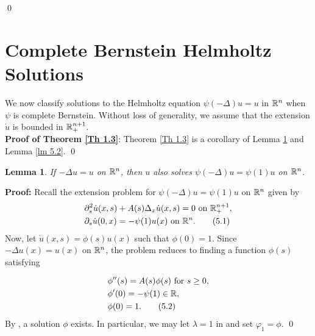 \documentclass{article}
\newtheorem{lemma}[theorem]{Lemma}
\begin{document}
\qed

\section{Complete Bernstein Helmholtz Solutions}

We now classify solutions to the Helmholtz equation $\psi(-\Delta)u = u$ in $\mathbb{R}^n$ when $\psi$ is complete Bernstein. Without loss of generality, we assume that the extension $\dot{u}$ is bounded in $\mathbb{R}^{n+1}_+$.\\

\noindent
\textbf{Proof of Theorem  \ref{Th 1.3}}: Theorem \ref{Th 1.3} is a corollary of Lemma \ref{lm 5.1} and Lemma \ref{lm 5.2}. \qed

\begin{lemma}
\label{lm 5.1}
If $-\Delta u = u$ on $\mathbb{R}^n$, then $u$ also solves $\psi(-\Delta) u = \psi(1) u$ on $\mathbb{R}^n$.
\end{lemma}


\noindent
\textbf{Proof:} Recall the extension problem for $\psi(-\Delta) u = \psi(1)u$ on $\mathbb{R}^n$ given by 
\begin{align*}
    &\partial_s ^2 \dot{u}(x,s) + A(s) \Delta_x \dot{u}(x,s) = 0 \textrm{ on } \mathbb{R}^{n+1}_+, \\
    &\partial_s \dot{u}(0,x) =  -\psi(1) u(x) \textrm{ on } \mathbb{R}^n.
     \tag{5.1} \label{eq: 5.1}
\end{align*}
Now, let $\dot{u}(x,s) = \phi(s) u(x)$ such that $\phi(0)=1$. Since $-\Delta u(x) = u(x)$ on $\mathbb{R}^n$, the problem reduces to finding a function $\phi(s)$ satisfying

\begin{align*}
    &\phi''(s) = A(s) \phi(s) \textrm{ for } s \ge 0, \\
    &\phi'(0)=-\psi(1) \in \mathbb{R},\\
    &\phi(0)=1.
     \tag{5.2} \label{eq: 5.2}
\end{align*}
By \cite[Section 3.1]{kwas}, a solution $\phi$ exists. In particular, we may let $\lambda=1$ in \cite[(3.1)]{kwas} and set $\varphi_1=\phi $. \qed \\

\end{document}
